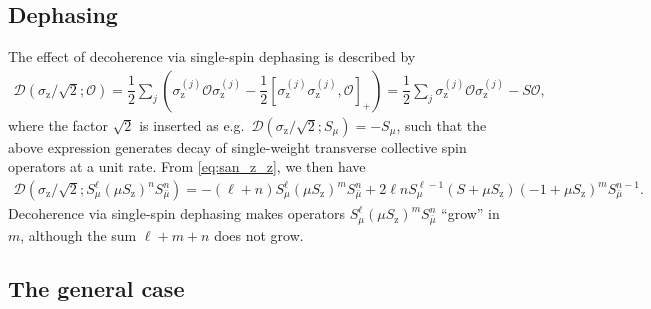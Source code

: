\documentclass[aps,notitlepage,nofootinbib,11pt]{revtex4-1}
\newcommand{\f}[2]{\dfrac{#1}{#2}} %
\newcommand{\p}[1]{\left(#1\right)} %
\renewcommand{\sp}[1]{\left[#1\right]} %
\newcommand{\D}{\mathcal{D}}
\renewcommand{\O}{\mathcal{O}}
\newcommand{\z}{\text{z}}
\newcommand{\bmu}{{\bar\mu}}
\newcommand{\1}{\mathds{1}}
\begin{document}
\subsection{Dephasing}
\label{sec:dephasing_single}

The effect of decoherence via single-spin dephasing is described by
\begin{align}
  \D\p{\sigma_\z/\sqrt2; \O}
  = \f12 \sum_j\p{\sigma_\z^{(j)} \O \sigma_\z^{(j)}
    - \f12\sp{\sigma_\z^{(j)} \sigma_\z^{(j)},\O}_+}
  = \f12 \sum_j \sigma_\z^{(j)} \O \sigma_\z^{(j)} - S \O,
\end{align}
where the factor $\sqrt2$ is inserted as
e.g.~$\D\p{\sigma_\z/\sqrt2;S_\mu}=-S_\mu$, such that the above
expression generates decay of single-weight transverse collective spin
operators at a unit rate.  From \eqref{eq:san_z_z}, we then have
\begin{align}
  \D\p{\sigma_\z/\sqrt2; S_\mu^\ell \p{\mu S_\z}^n S_\bmu^n}
  = -\p{\ell+n} S_\mu^\ell \p{\mu S_\z}^m S_\bmu^n
  + 2 \ell n S_\mu^{\ell-1} \p{S + \mu S_\z}
  \p{-1 + \mu S_\z}^m S_\bmu^{n-1}.
\end{align}
Decoherence via single-spin dephasing makes operators
$S_\mu^\ell \p{\mu S_\z}^m S_\bmu^n$ ``grow'' in $m$, although the sum
$\ell+m+n$ does not grow.


\subsection{The general case}
\label{sec:general_single}
\end{document}
